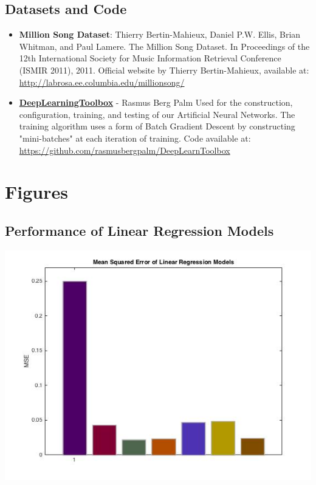 \documentclass[12pt]{article}
\begin{document}
\subsection{Datasets and Code}
\label{subsec:datasetsAndCode}
\begin{itemize}
    \item \textbf{Million Song Dataset}: 
    \subitem Thierry Bertin-Mahieux, Daniel P.W. Ellis, Brian Whitman, and Paul Lamere. 
    The Million Song Dataset. In Proceedings of the 12th International Society
    for Music Information Retrieval Conference (ISMIR 2011), 2011. Official website by Thierry Bertin-Mahieux,
    available at: \href{http://labrosa.ee.columbia.edu/millionsong/}{http://labrosa.ee.columbia.edu/millionsong/}\vspace{-1ex}
    
    \item \href{https://github.com/rasmusbergpalm/DeepLearnToolbox}{\textbf{DeepLearningToolbox}} - Rasmus Berg Palm
    \subitem Used for the construction, configuration, training, and testing of our Artificial Neural Networks. The training algorithm uses a form of Batch Gradient Descent by constructing "mini-batches" at each iteration of training. Code available at:\\ \href{https://github.com/rasmusbergpalm/DeepLearnToolbox}{https://github.com/rasmusbergpalm/DeepLearnToolbox}\vspace{-1ex}
\end{itemize}

\appendix
\section{Figures}
\label{sec:figures}
\subsection{Performance of Linear Regression Models}
\label{subsec:MSE}
\includegraphics[scale=.5]{images/lr/mse}
\end{document}
